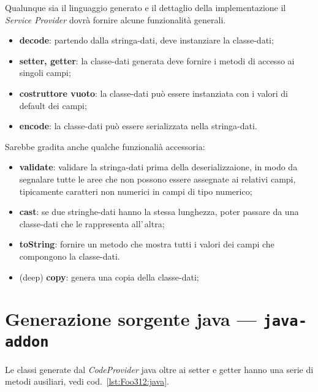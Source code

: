 \documentclass[a4paper,10pt]{report}
\begin{document}
Qualunque sia il linguaggio generato e il dettaglio della implementazione il
\textsl{Service Provider} dovrà fornire alcune funzionalità generali.

\begin{itemize}
\item \textbf{decode}: partendo dalla stringa-dati, deve instanziare la 
    classe-dati;
\item \textbf{setter, getter}: la classe-dati generata deve fornire i metodi di 
    accesso ai singoli campi;
\item \textbf{costruttore vuoto}: la classe-dati può essere instanziata con i 
    valori di default dei campi;
\item \textbf{encode}: la classe-dati può essere serializzata nella 
    stringa-dati.
\end{itemize}
Sarebbe gradita anche qualche funzionalià accessoria:
\begin{itemize}
\item \textbf{validate}: validare la stringa-dati prima della 
    deserializzaione, in modo da segnalare tutte le aree che non possono essere
    assegnate ai relativi campi, tipicamente caratteri non numerici in campi di
    tipo numerico;
\item \textbf{cast}: se due stringhe-dati hanno la stessa lunghezza, poter 
    passare da una classe-dati che le rappresenta all'\,altra;
\item \textbf{toString}: fornire un metodo che mostra tutti i valori dei campi 
    che compongono la classe-dati.
\item (deep) \textbf{copy}: genera una copia della classe-dati;
\end{itemize}



\section{Generazione sorgente java --- \texttt{java-addon}}
Le classi generate dal \textsl{CodeProvider} java oltre ai setter e getter
hanno una serie di metodi ausiliari, vedi cod.~\ref{lst:Foo312:java}.
\end{document}
